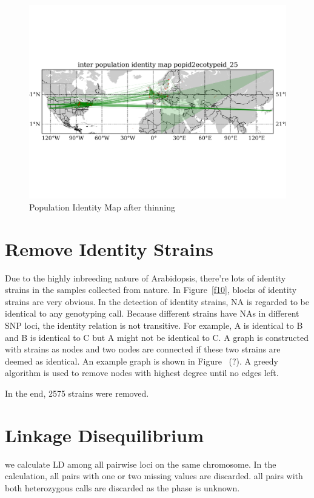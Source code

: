 \documentclass[a4paper,10pt]{article}
\begin{document}
\begin{figure}
\includegraphics[width=1\textwidth]{figures/identity_map2_complete_site_network.png}
\caption{Population Identity Map after thinning}\label{f28}
\end{figure}

\section{Remove Identity Strains}
Due to the highly inbreeding nature of Arabidopsis, there're lots of identity strains in the samples collected from nature. In Figure~\ref{f10}, blocks of identity strains are very obvious. In the detection of identity strains, NA is regarded to be identical to any genotyping call. Because different strains have NAs in different SNP loci, the identity relation is not transitive. For example, A is identical to B and B is identical to C but A might not be identical to C. A graph is constructed with strains as nodes and two nodes are connected if these two strains are deemed as identical. An example graph is shown in Figure ~(?). A greedy algorithm is used to remove nodes with highest degree until no edges left.

In the end, 2575 strains were removed.

\section{Linkage Disequilibrium}
we calculate LD among all pairwise loci on the same chromosome. In the calculation, all pairs with one or two missing values are discarded. all pairs with both heterozygous calls are discarded as the phase is unknown.
\end{document}
